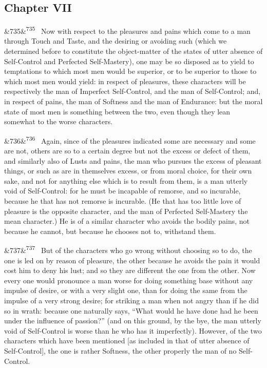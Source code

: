 \documentclass[12pt]{article}
\newcommand{\para}[1][]{\par\noindent\ifx&#1&\else\textsuperscript{\footnotesize #1}~\fi}
\begin{document}
\subsection*{Chapter VII}

\para[735] Now with respect to the pleasures and pains which come to a man through Touch and Taste, and the desiring or avoiding such (which we determined before to constitute the object-matter of the states of utter absence of Self-Control and Perfected Self-Mastery), one may be so disposed as to yield to temptations to which most men would be superior, or to be superior to those to which most men would yield: in respect of pleasures, these characters will be respectively the man of Imperfect Self-Control, and the man of Self-Control; and, in respect of pains, the man of Softness and the man of Endurance: but the moral state of most men is something between the two, even though they lean somewhat to the worse characters.

\para[736] Again, since of the pleasures indicated some are necessary and some are not, others are so to a certain degree but not the excess or defect of them, and similarly also of Lusts and pains, the man who pursues the excess of pleasant things, or such as are in themselves excess, or from moral choice, for their own sake, and not for anything else which is to result from them, is a man utterly void of Self-Control: for he must be incapable of remorse, and so incurable, because he that has not remorse is incurable. (He that has too little love of pleasure is the opposite character, and the man of Perfected Self-Mastery the mean character.) He is of a similar character who avoids the bodily pains, not because he cannot, but because he chooses not to, withstand them.

\para[737] But of the characters who go wrong without choosing so to do, the one is led on by reason of pleasure, the other because he avoids the pain it would cost him to deny his lust; and so they are different the one from the other. Now every one would pronounce a man worse for doing something base without any impulse of desire, or with a very slight one, than for doing the same from the impulse of a very strong desire; for striking a man when not angry than if he did so in wrath: because one naturally says, “What would he have done had he been under the influence of passion?” (and on this ground, by the bye, the man utterly void of Self-Control is worse than he who has it imperfectly). However, of the two characters which have been mentioned [as included in that of utter absence of Self-Control], the one is rather Softness, the other properly the man of no Self-Control.
\end{document}
